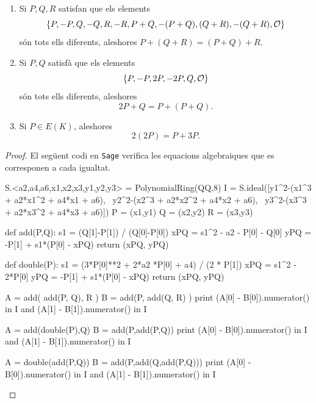\begin{proposition}
\begin{enumerate}
    \item Si $P,Q,R$ satisfan que els elements
    \[
    \{P,-P,Q,-Q,R,-R,P+Q,-(P+Q),(Q+R),-(Q+R),\mathcal{O}\}
    \]
    són tots ells diferents, aleshores
    $P+(Q+R)=(P+Q)+R$.
    \item Si $P,Q$ satisfà que els elements
    \[
    \{ P, -P, 2P, -2P, Q, \mathcal{O}\}
    \]
    són tots ells diferents, aleshores
    \[
    2P+Q = P+(P+Q).
    \]
    \item Si $P\in E(K)$, aleshores
    \[
    2(2P) = P + 3P.
    \]
\end{enumerate}
\end{proposition}
\begin{proof}
 El següent codi en \texttt{Sage} verifica les equacions algebraiques que es corresponen a cada igualtat.

\begin{python}
S.<a2,a4,a6,x1,x2,x3,y1,y2,y3> = PolynomialRing(QQ,8)
I = S.ideal([y1^2-(x1^3 + a2*x1^2 + a4*x1 + a6), \ 
             y2^2-(x2^3 + a2*x2^2 + a4*x2 + a6), \ 
             y3^2-(x3^3 + a2*x3^2 + a4*x3 + a6)])
P = (x1,y1)
Q = (x2,y2)
R = (x3,y3)

def add(P,Q):
    s1 = (Q[1]-P[1]) / (Q[0]-P[0])
    xPQ = s1^2 - a2 - P[0] - Q[0]
    yPQ = -P[1] + s1*(P[0] - xPQ)
    return (xPQ, yPQ)

def double(P):
    s1 = (3*P[0]**2 + 2*a2 *P[0] + a4) / (2 * P[1])
    xPQ = s1^2 - 2*P[0]
    yPQ = -P[1] + s1*(P[0] - xPQ)
    return (xPQ, yPQ)

A = add( add(P, Q), R )
B = add(P, add(Q, R) )
print (A[0] - B[0]).numerator() in I and (A[1] - B[1]).numerator() in I

A = add(double(P),Q)
B = add(P,add(P,Q))
print (A[0] - B[0]).numerator() in I and (A[1] - B[1]).numerator() in I

A = double(add(P,Q))
B = add(P,add(Q,add(P,Q)))
print (A[0] - B[0]).numerator() in I and (A[1] - B[1]).numerator() in I
\end{python}
\end{proof}

